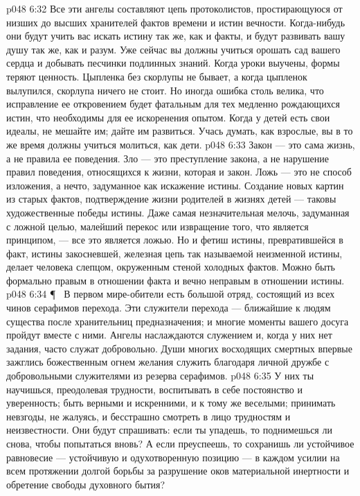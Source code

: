 \vs p048 6:32 Все эти ангелы составляют цепь протоколистов, простирающуюся от низших до высших хранителей фактов времени и истин вечности. Когда\hyp{}нибудь они будут учить вас искать истину так же, как и факты, и будут развивать вашу душу так же, как и разум. Уже сейчас вы должны учиться орошать сад вашего сердца и добывать песчинки подлинных знаний. Когда уроки выучены, формы теряют ценность. Цыпленка без скорлупы не бывает, а когда цыпленок вылупился, скорлупа ничего не стоит. Но иногда ошибка столь велика, что исправление ее откровением будет фатальным для тех медленно рождающихся истин, что необходимы для ее искоренения опытом. Когда у детей есть свои идеалы, не мешайте им; дайте им развиться. Учась думать, как взрослые, вы в то же время должны учиться молиться, как дети.
\vs p048 6:33 Закон --- это сама жизнь, а не правила ее поведения. Зло --- это преступление закона, а не нарушение правил поведения, относящихся к жизни, которая и  закон. Ложь --- это не способ изложения, а нечто, задуманное как искажение истины. Создание новых картин из старых фактов, подтверждение жизни родителей в жизнях детей --- таковы художественные победы истины. Даже самая незначительная мелочь, задуманная с ложной целью, малейший перекос или извращение того, что является принципом, --- все это является ложью. Но и фетиш истины, превратившейся в факт, истины закосневшей, железная цепь так называемой неизменной истины, делает человека слепцом, окруженным стеной холодных фактов. Можно быть формально правым в отношении факта и вечно неправым в отношении истины.
\vs p048 6:34 \P\ \bibnobreakspace {} В первом мире\hyp{}обители есть большой отряд, состоящий из всех чинов серафимов перехода. Эти служители перехода --- ближайшие к людям существа после хранительниц предназначения; и многие моменты вашего досуга пройдут вместе с ними. Ангелы наслаждаются служением и, когда у них нет задания, часто служат добровольно. Души многих восходящих смертных впервые зажглись божественным огнем желания служить благодаря личной дружбе с добровольными служителями из резерва серафимов.
\vs p048 6:35 У них ты научишься, преодолевая трудности, воспитывать в себе постоянство и уверенность; быть верными и искренними, и к тому же веселыми; принимать невзгоды, не жалуясь, и бесстрашно смотреть в лицо трудностям и неизвестности. Они будут спрашивать: если ты упадешь, то поднимешься ли снова, чтобы попытаться вновь? А если преуспеешь, то сохранишь ли устойчивое равновесие --- устойчивую и одухотворенную позицию --- в каждом усилии на всем протяжении долгой борьбы за разрушение оков материальной инертности и обретение свободы духовного бытия?
